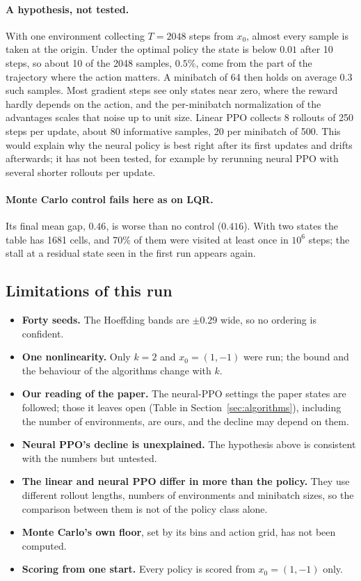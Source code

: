 \documentclass[11pt]{article}
\begin{document}
\paragraph{A hypothesis, not tested.} With one environment collecting $T = 2048$ steps from
$x_0$, almost every sample is taken at the origin. Under the optimal policy the state is below $0.01$
after 10 steps, so about 10 of the 2048 samples, $0.5\%$, come from the part of the trajectory where
the action matters. A minibatch of 64 then holds on average $0.3$ such samples. Most gradient steps
see only states near zero, where the reward hardly depends on the action, and the per-minibatch
normalization of the advantages scales that noise up to unit size. Linear PPO collects 8 rollouts of
250 steps per update, about 80 informative samples, 20 per minibatch of 500. This would explain
why the neural policy is best right after its first updates and drifts afterwards; it has not been
tested, for example by rerunning neural PPO with several shorter rollouts per update.

\paragraph{Monte Carlo control fails here as on LQR.} Its final mean gap, $0.46$, is worse than no
control ($0.416$). With two states the table has 1681 cells, and 70\% of them were visited at least
once in $10^6$ steps; the stall at a residual state seen in the first run appears again.

\subsection{Limitations of this run}

\begin{itemize}[leftmargin=*]
  \item \textbf{Forty seeds.} The Hoeffding bands are $\pm 0.29$ wide, so no ordering is confident.
  \item \textbf{One nonlinearity.} Only $k = 2$ and $x_0 = (1, -1)$ were run; the bound and the
    behaviour of the algorithms change with $k$.
  \item \textbf{Our reading of the paper.} The neural-PPO settings the paper states are followed;
    those it leaves open (Table in Section~\ref{sec:algorithms}), including the number of
    environments, are ours, and the decline may depend on them.
  \item \textbf{Neural PPO's decline is unexplained.} The hypothesis above is consistent with the
    numbers but untested.
  \item \textbf{The linear and neural PPO differ in more than the policy.} They use different
    rollout lengths, numbers of environments and minibatch sizes, so the comparison between them
    is not of the policy class alone.
  \item \textbf{Monte Carlo's own floor}, set by its bins and action grid, has not been computed.
  \item \textbf{Scoring from one start.} Every policy is scored from $x_0 = (1, -1)$ only.
\end{itemize}
\end{document}
